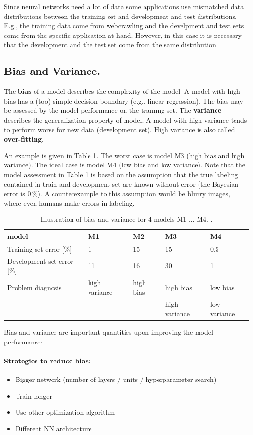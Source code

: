 \documentclass[12pt,a4paper]{article}
\begin{document}
Since neural networks need a lot of data some applications use mismatched data distributions between the training set and development and test distributions. E.g., the training data come from webcrawling and the develpment and test sets come from the specific application at hand. However, in this case it is necessary that the development and the test set come from the same distribution.

\subsection{Bias and Variance.}
The \textbf{bias} of a model describes the complexity of the model. A model with high bias has a (too) simple decision boundary (e.g., linear regression). The bias may be assessed by the model performance on the training set. The \textbf{variance} describes the generalization property of model. A model with high variance tends to perform worse for new data (development set). High variance is also called \textbf{over-fitting}.

An example is given in Table \ref{table:bias_variance}. The worst case is model M3 (high bias and high variance). The ideal case is model M4 (low bias and low variance). Note that the model assessment in Table \ref{table:bias_variance} is based on the assumption that the true labeling contained in train and development set are known without error (the Bayesian error is 0\,\%).  A counterexample to this assumption would be blurry images, where even humans make errors in labeling. 
\begin{table}[]\label{table:bias_variance}

	\begin{tabular}{l llll}
		\hline   \hline
		 model &M1 &M2 &M3 &M4 \\
		\hline 
		Training set error [\%]  &1  &15  &15  &0.5 \\
		Development set  error  [\%]       &11 &16  &30  &1 \\
		\hline
		Problem diagnosis	& high variance &  high bias & high bias & low bias \\
							&  &  & high variance & low variance \\
							\hline \hline					 
	\end{tabular}
\caption{Illustration of bias and variance for 4 models M1 ... M4. .}
\end{table}
Bias and variance  are important quantities upon improving the model performance:
\paragraph{Strategies to reduce bias:}
\begin{itemize}
	\setlength\itemsep{0em}
	\item Bigger network (number of layers / units / hyperparameter search) 
	\item Train longer 
	\item Use other optimization algorithm
	\item Different NN architecture
\end{itemize}
\end{document}
